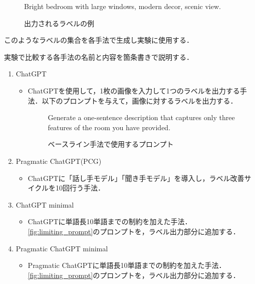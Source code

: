 \documentclass[a4paper,11pt]{jreport}
\begin{document}
\begin{figure}[H]
\begin{mdframed}[linewidth=1pt]
Bright bedroom with large windows, modern decor, scenic view.
\end{mdframed}
\caption{出力されるラベルの例}
\label{fig:label_example}
\end{figure}

このようなラベルの集合を各手法で生成し実験に使用する．

実験で比較する各手法の名前と内容を箇条書きで説明する．

\begin{enumerate}
  \item ChatGPT
  \begin{itemize}
  \item ChatGPTを使用して，1枚の画像を入力して1つのラベルを出力する手法．以下のプロンプトを与えて，画像に対するラベルを出力する．
  \begin{figure}[H]
    \begin{mdframed}[linewidth=1pt]
      Generate a one-sentence description that captures only three features of the room you have provided.
    \end{mdframed}
    \caption{ベースライン手法で使用するプロンプト}
    \label{fig:baseline_prompt}
  \end{figure}
\end{itemize}
  
  \item Pragmatic ChatGPT(PCG)
  \begin{itemize}
    \item ChatGPTに「話し手モデル」「聞き手モデル」を導入し，ラベル改善サイクルを10回行う手法．
  \end{itemize}
    
  \item ChatGPT minimal
  \begin{itemize}
    \item ChatGPTに単語長10単語までの制約を加えた手法．\ref{fig:limiting_prompt}のプロンプトを，ラベル出力部分に追加する．
  \end{itemize}
  
  \item Pragmatic ChatGPT minimal
  \begin{itemize}
    \item Pragmatic ChatGPTに単語長10単語までの制約を加えた手法．\ref{fig:limiting_prompt}のプロンプトを，ラベル出力部分に追加する．
  \end{itemize}
  
\end{enumerate}
\end{document}
